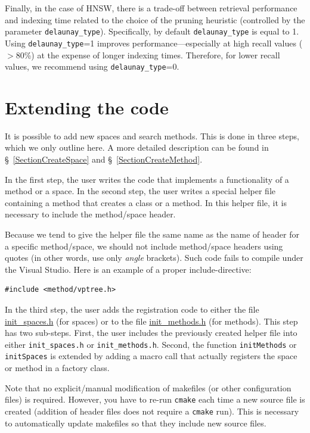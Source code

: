 \documentclass[runningheads,a4paper]{llncs}
\newcommand{\replocfile}{https://github.com/searchivarius/nmslib/blob/v1.5/}
\newcommand{\ttt}[1]{\texttt{#1}}
\begin{document}
Finally, in the case of HNSW, there is a trade-off between retrieval performance and indexing time
related to the choice of the pruning heuristic (controlled by the parameter \ttt{delaunay\_type}). 
Specifically, by default \ttt{delaunay\_type} is equal to 1.
Using \ttt{delaunay\_type}=1 improves performance---especially at high recall values ($>80$\%) at the expense of longer indexing times. 
Therefore, for lower recall values, we recommend using \ttt{delaunay\_type}=0.

\section{Extending the code}\label{SectionExtend}
It is possible to add new spaces and search methods.
This is done in three steps, which we only outline here.
A more detailed description can be found in \S~\ref{SectionCreateSpace}
and \S~\ref{SectionCreateMethod}.

In the first step, the user writes the code that implements a
functionality of a method or a space.
In the second step, the user writes a special helper file  
containing a method that creates a class or a method.
In this helper file, it is necessary to include
the method/space header. 

Because we tend to give the helper file the same name
as the name of header for a specific method/space,
we should not include method/space headers using quotes (in other words,
use only \emph{angle} brackets).
Such code fails to compile under the Visual Studio. 
Here is an example of a proper include-directive:
\begin{verbatim}
#include <method/vptree.h>
\end{verbatim}


In the third step, the user adds 
the registration code to either the file 
\href{\replocfile similarity_search/include/factory/init_spaces.h}{init\_spaces.h} (for spaces)
or to the file
\href{\replocfile similarity_search/include/factory/init_methods.h}{init\_methods.h} (for methods).
This step has two sub-steps. 
First, the user includes the previously created helper file into either
\ttt{init\_spaces.h} or \ttt{init\_methods.h}.
Second, the function \ttt{initMethods} or \ttt{initSpaces} is extended
by adding a macro call that actually registers the space or method in a factory class.

Note that no explicit/manual modification of makefiles (or other configuration files) is required.
However, you have to re-run \ttt{cmake} each time a new source file is created (addition
of header files does not require a \ttt{cmake} run). This is necessary to automatically update makefiles so that they include new source files.
\end{document}
